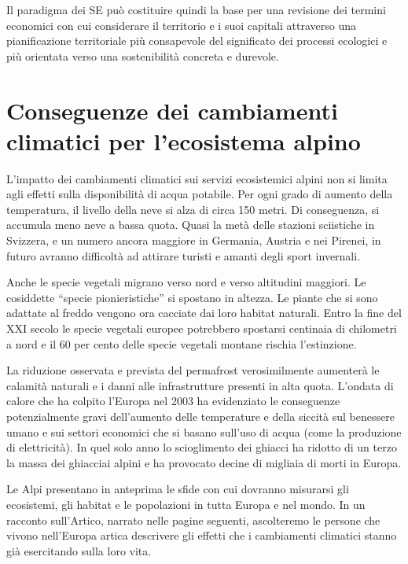 \documentclass[11pt,a4paper]{article}
\begin{document}
	Il paradigma dei SE può costituire quindi la base per una revisione dei termini economici con cui considerare il territorio e i suoi capitali attraverso una  pianificazione territoriale più consapevole del significato dei processi ecologici e più orientata verso una sostenibilità concreta e durevole.
	
	
	\section{Conseguenze dei cambiamenti climatici per l'ecosistema alpino \cite{LeAlpi}}
	
	L'impatto dei cambiamenti climatici sui servizi ecosistemici alpini non si limita agli effetti sulla disponibilità di acqua potabile. Per ogni grado di aumento della temperatura, il livello della neve si alza di circa 150 metri. Di conseguenza, si accumula meno neve a bassa quota. Quasi la metà delle stazioni sciistiche in Svizzera, e un numero ancora maggiore in Germania, Austria e nei Pirenei, in futuro avranno difficoltà ad attirare turisti e amanti degli sport invernali.
	
	Anche le specie vegetali migrano verso nord e verso altitudini maggiori. Le cosiddette ``specie pionieristiche'' si spostano in altezza. Le piante che si sono adattate al freddo vengono ora cacciate dai loro habitat naturali. Entro la fine del XXI secolo le specie vegetali europee potrebbero spostarsi centinaia di chilometri a nord e il 60 per cento delle specie vegetali montane rischia l'estinzione.
	
	La riduzione osservata e prevista del permafrost verosimilmente aumenterà le calamità naturali e i danni alle infrastrutture presenti in alta quota. L'ondata di calore che ha colpito l'Europa nel 2003 ha evidenziato le conseguenze potenzialmente gravi dell'aumento delle temperature e della siccità sul benessere umano e sui settori economici che si basano sull'uso di acqua (come la produzione di elettricità). In quel solo anno lo scioglimento dei ghiacci ha ridotto di un terzo la massa dei ghiacciai alpini e ha provocato decine di migliaia di morti in Europa.
	
	Le Alpi presentano in anteprima le sfide con cui dovranno misurarsi gli ecosistemi, gli habitat e le popolazioni in tutta Europa e nel mondo. In un racconto sull'Artico, narrato nelle pagine seguenti, ascolteremo le persone che vivono nell'Europa artica descrivere gli effetti che i cambiamenti climatici stanno già esercitando sulla loro vita.
	
\end{document}
